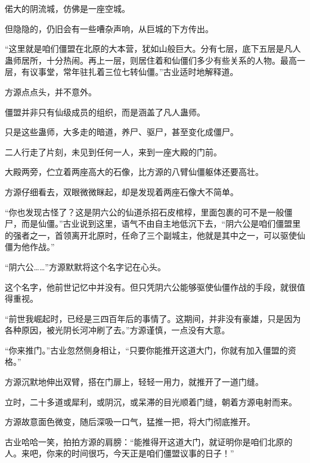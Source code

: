 \begin{this_body}
偌大的阴流城，仿佛是一座空城。

但隐隐的，仍旧会有一些嘈杂声响，从巨城的下方传出。

“这里就是咱们僵盟在北原的大本营，犹如山般巨大。分有七层，底下五层是凡人蛊师居所，十分热闹。再上一层，则居住着和仙僵们多少有些关系的人物。最高一层，有议事堂，常年驻扎着三位七转仙僵。”古业适时地解释道。

方源点点头，并不意外。

僵盟并非只有仙级成员的组织，而是涵盖了凡人蛊师。

只是这些蛊师，大多走的暗道，养尸、驱尸，甚至变化成僵尸。

二人行走了片刻，未见到任何一人，来到一座大殿的门前。

大殿两旁，伫立着两座高大的石像，比方源的八臂仙僵躯体还要高壮。

方源仔细看去，双眼微微眯起，却是发现着两座石像大不简单。

“你也发现古怪了？这是阴六公的仙道杀招石皮棺椁，里面包裹的可不是一般僵尸，而是仙僵。”古业说到这里，语气不由自主地低沉下去，“阴六公是咱们僵盟里的强者之一，首领离开北原时，任命了三个副城主，他就是其中之一，可以驱使仙僵为他作战。”

“阴六公……”方源默默将这个名字记在心头。

这个名字，他前世记忆中并没有。但只凭阴六公能够驱使仙僵作战的手段，就很值得重视。

“前世我崛起时，已经是三四百年后的事情了。这期间，并非没有豪雄，只是因为各种原因，被光阴长河冲刷了去。”方源谨慎，一点没有大意。

“你来推门。”古业忽然侧身相让，“只要你能推开这道大门，你就有加入僵盟的资格。”

方源沉默地伸出双臂，搭在门扉上，轻轻一用力，就推开了一道门缝。

立时，二十多道或犀利，或阴沉，或呆滞的目光顺着门缝，朝着方源电射而来。

方源故意面色微变，随后深吸一口气，猛推一把，将大门彻底推开。

古业哈哈一笑，拍拍方源的肩膀：“能推得开这道大门，就证明你是咱们北原的人。来吧，你来的时间很巧，今天正是咱们僵盟议事的日子！”

\end{this_body}

